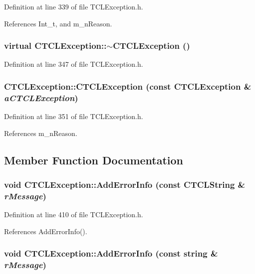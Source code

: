 Definition at line 339 of file TCLException.h.

References Int\_\-t, and m\_\-n\-Reason.
\subsubsection{\setlength{\rightskip}{0pt plus 5cm}virtual CTCLException::$\sim$CTCLException ()\hspace{0.3cm}{\tt  [inline, virtual]}}\label{classCTCLException_a2}




Definition at line 347 of file TCLException.h.
\subsubsection{\setlength{\rightskip}{0pt plus 5cm}CTCLException::CTCLException (const CTCLException \& {\em a\-CTCLException})\hspace{0.3cm}{\tt  [inline]}}\label{classCTCLException_a3}




Definition at line 351 of file TCLException.h.

References m\_\-n\-Reason.

\subsection{Member Function Documentation}
\subsubsection{\setlength{\rightskip}{0pt plus 5cm}void CTCLException::Add\-Error\-Info (const {\bf CTCLString} \& {\em r\-Message})\hspace{0.3cm}{\tt  [inline]}}\label{classCTCLException_a9}




Definition at line 410 of file TCLException.h.

References Add\-Error\-Info().
\subsubsection{\setlength{\rightskip}{0pt plus 5cm}void CTCLException::Add\-Error\-Info (const string \& {\em r\-Message})\hspace{0.3cm}{\tt  [inline]}}\label{classCTCLException_a8}




